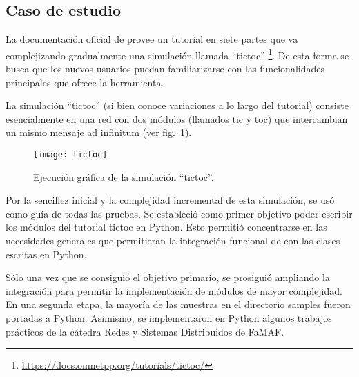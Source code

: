 \subsection{Caso de estudio}
La documentación oficial de \omnetpp{} provee un tutorial en siete partes que
va complejizando gradualmente una simulación llamada ``tictoc''
\footnote{\url{https://docs.omnetpp.org/tutorials/tictoc/}}. De esta forma se
busca que los nuevos usuarios puedan familiarizarse con las funcionalidades
principales que ofrece la herramienta.

La simulación ``tictoc'' (si bien conoce variaciones a lo largo del tutorial)
consiste esencialmente en una red con dos módulos (llamados tic y toc) que
intercambian un mismo mensaje ad infinitum (ver fig.~\ref{fig:tictoc}).

\begin{figure}[h]
\caption{Ejecución gráfica de la simulación ``tictoc''.}
\label{fig:tictoc}
\centering
\texttt{[image: tictoc]}
\end{figure}

Por la sencillez inicial y la complejidad incremental de esta simulación, se
usó como guía de todas las pruebas. Se estableció como primer objetivo poder
escribir los módulos del tutorial tictoc en Python. Esto permitió concentrarse
en las necesidades generales que permitieran la integración funcional de
\omnetpp{} con las clases escritas en Python.

Sólo una vez que se consiguió el objetivo primario, se prosiguió ampliando la
integración para permitir la implementación de módulos de mayor complejidad. En
una segunda etapa, la mayoría de las muestras en el directorio samples fueron
portadas a Python. Asimismo, se implementaron en Python algunos trabajos
prácticos de la cátedra Redes y Sistemas Distribuidos de FaMAF.
